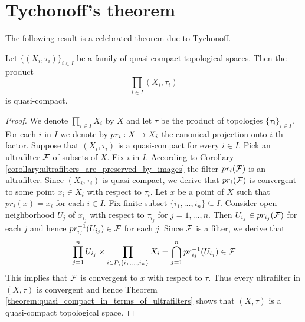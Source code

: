 \section{Tychonoff's theorem}
\noindent
The following result is a celebrated theorem due to Tychonoff.

\begin{theorem}\label{theorem:Tychonoff_theorem}
Let $\big\{\left(X_i,\tau_i\right)\big\}_{i\in I}$ be a family of quasi-compact topological spaces. Then the product
$$\prod_{i\in I}\left(X_i,\tau_i\right)$$
is quasi-compact.
\end{theorem}
\begin{proof}
We denote $\prod_{i\in I}X_i$ by $X$ and let $\tau$ be the product of topologies $\{\tau_i\}_{i\in I}$. For each $i$ in $I$ we denote by $pr_i:X \rightarrow X_i$ the canonical projection onto $i$-th factor. Suppose that $\left(X_i,\tau_i\right)$ is a quasi-compact for every $i\in I$. Pick an ultrafilter ${\mathcal F}$ of subsets of $X$. Fix $i$ in $I$. According to Corollary \ref{corollary:ultrafilters_are_preserved_by_images} the filter $pr_i({\mathcal F})$ is an ultrafilter. Since $\left(X_i,\tau_i\right)$ is quasi-compact, we derive that $pr_i({\mathcal F})$ is convergent to some point $x_i\in X_i$ with respect to $\tau_i$. Let $x$ be a point of $X$ such that $pr_i(x) = x_i$ for each $i\in I$. Fix finite subset $\{i_1,...,i_n\}\subseteq I$. Consider open neighborhood $U_j$ of $x_{i_j}$ with respect to $\tau_{i_j}$ for $j=1,...,n$. Then $U_{i_j}\in pr_{i_j}({\mathcal F})$ for each $j$ and hence $pr_{i_j}^{-1}(U_{i_j}) \in {\mathcal F}$ for each $j$. Since ${\mathcal F}$ is a filter, we derive that
$$\prod_{j=1}^nU_{i_j}\times \prod_{i\in I\setminus \{i_1,...,i_n\}}X_i = \bigcap_{j=1}^npr^{-1}_{i_j}(U_{i_j}) \in {\mathcal F}$$
This implies that ${\mathcal F}$ is convergent to $x$ with respect to $\tau$. Thus every ultrafilter in $(X,\tau)$ is convergent and hence Theorem \ref{theorem:quasi_compact_in_terms_of_ultrafilters} shows that $\left(X,\tau\right)$ is a quasi-compact topological space.
\end{proof}


